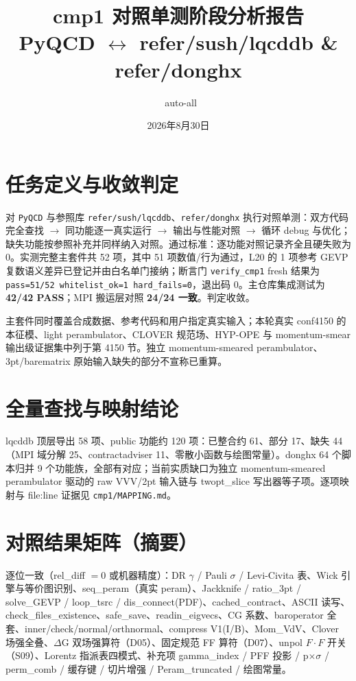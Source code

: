 \documentclass[10.5pt]{ctexart}
\title{cmp1 对照单测阶段分析报告\\{\large PyQCD $\leftrightarrow$ refer/sush/lqcddb \& refer/donghx}}
\author{~auto-all}
\date{2026年8月30日}
\begin{document}
\maketitle

\section{任务定义与收敛判定}
对 \verb|PyQCD| 与参照库 \verb|refer/sush/lqcddb|、\verb|refer/donghx| 执行对照单测：双方代码完全查找 $\rightarrow$ 同功能逐一真实运行 $\rightarrow$ 输出与性能对照 $\rightarrow$ 循环 debug 与优化；缺失功能按参照补充并同样纳入对照。通过标准：逐功能对照记录齐全且硬失败为 0。实测完整主套件共 52 项，其中 51 项数值/行为通过，L20 的 1 项参考 GEVP 复数语义差异已登记并由白名单门接纳；断言门 \verb|verify_cmp1| fresh 结果为 \verb|pass=51/52 whitelist_ok=1 hard_fails=0|，退出码 0。主仓库集成测试为 \textbf{42/42 PASS}；MPI 搬运层对照 \textbf{24/24 一致}。判定收敛。

主套件同时覆盖合成数据、参考代码和用户指定真实输入；本轮真实 conf4150 的本征模、light perambulator、CLOVER 规范场、HYP-OPE 与 momentum-smear 输出级证据集中列于第 4150 节。独立 momentum-smeared perambulator、3pt/barematrix 原始输入缺失的部分不宣称已重算。

\section{全量查找与映射结论}
lqcddb 顶层导出 58 项、public 功能约 120 项：已整合约 61、部分 17、缺失 44（MPI 域分解 25、contractadviser 11、零散小函数与绘图常量）。donghx 64 个脚本归并 9 个功能族，全部有对应；当前实质缺口为独立 momentum-smeared perambulator 驱动的 raw VVV/2pt 输入链与 twopt\_slice 写出器等子项。逐项映射与 file:line 证据见 \verb|cmp1/MAPPING.md|。

\section{对照结果矩阵（摘要）}
逐位一致（rel\_diff $=0$ 或机器精度）：DR $\gamma$ / Pauli $\sigma$ / Levi-Civita 表、Wick 引擎与等价图识别、seq\_peram（真实 peram）、Jackknife / ratio\_3pt / solve\_GEVP / loop\_tsrc / dis\_connect(PDF)、cached\_contract、ASCII 读写、check\_files\_existence、safe\_save、readin\_eigvecs、CG 系数、baroperator 全套、inner/check/normal/orthnormal、compress V1(I/B)、Mom\_VdV、Clover 场强全叠、$\Delta$G 双场强算符（D05）、固定规范 FF 算符（D07）、unpol $F\cdot F$ 开关（S09）、Lorentz 指派表四模式、补充项 gamma\_index / PFF 投影 / p$\times\sigma$ / perm\_comb / 缓存键 / 切片增强 / Peram\_truncated / 绘图常量。
\end{document}

